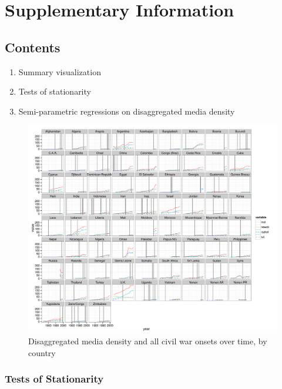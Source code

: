 \documentclass[12pt,article,oneside]{memoir}
\makeatletter
\def\maxwidth{\ifdim\Gin@nat@width>\linewidth\linewidth
\else\Gin@nat@width\fi}
\let\Oldincludegraphics\includegraphics
\renewcommand{\includegraphics}[1]{\Oldincludegraphics[width=\maxwidth]{#1}}
\makeatother
\begin{document}
\clearpage

\section{Supplementary Information}\label{supplementary-information}

\subsection{Contents}\label{contents}

\begin{enumerate}
\def\labelenumi{\arabic{enumi}.}
\itemsep1pt\parskip0pt
\item
  Summary visualization
\item
  Tests of stationarity
\item
  Semi-parametric regressions on disaggregated media density
\end{enumerate}

\begin{figure}[htbp]
\centering
\includegraphics{media_civil_war_files/figure-markdown/full_panel_plot.pdf}
\caption{Disaggregated media density and all civil war onsets over time,
by country}
\end{figure}

\subsubsection{Tests of Stationarity}\label{tests-of-stationarity}
\end{document}
